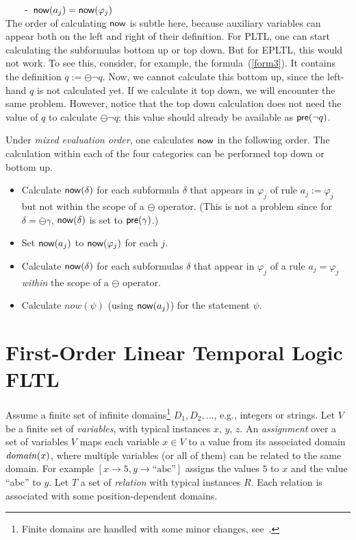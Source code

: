 \ \ \ \ -\ $\mathsf{now} ( a_j ) = \mathsf{now} ( \varphi_j )$ \\

 The order of calculating $\mathsf{now}$ is subtle here, because
auxiliary variables can appear both on the left and right of their
definition. For PLTL, one can start calculating the subformulas
bottom up or top down. But for EPLTL, this would not work. To see this, consider, for example, the formula~(\ref{form3}). It contains
the definition $q := \ominus \neg q$. Now, we cannot calculate this
bottom up, since the left-hand $q$ is not calculated yet.
If we calculate it top down, we will encounter the same problem.
However, notice that the top down calculation does not need the
value of $q$ to calculate $\ominus \neg q$; this value should already be available as $\mathsf{pre} ( \neg q )$.

Under {\em mixed evaluation order}, one calculates $\mathsf{now}$ in the following order. The calculation within each of the four categories can be performed top down or bottom up.
\begin{itemize}
\item Calculate 
$\mathsf{now} ( \delta )$ for each subformula $\delta$
that appears in $\varphi_j$ of rule
$a_j := \varphi_j$ but not within the scope of
a $\ominus$ operator. (This is not
a problem since for $\delta = \ominus \gamma$,
$\mathsf{now} ( \delta )$ is set to $\mathsf{pre} ( \gamma )$.)
\item Set 
$\mathsf{now} ( a_j )$ to $\mathsf{now} ( \varphi_j )$ for each $j$.
\item Calculate $\mathsf{now} ( \delta )$ for each subformulas $\delta$
that appear in $\varphi_j$ of a rule
$a_j = \varphi_j$ {\em  within} the scope of
a $\ominus$ operator.
\item Calculate $now ( \psi )$ (using $\mathsf{now} ( a_j )$) for
the statement $\psi$.
\end{itemize}



\section{First-Order Linear Temporal Logic FLTL}

\label{sec:syntax-semantics}

Assume a finite set of infinite domains\footnote{Finite domains are handled with some minor changes, see~\cite{HPU}.}
$D_1, D_2, \ldots$,
e.g., integers or strings. 
Let $V$ be a finite set of {\em variables}, 
with typical instances $x$, $y$, $z$.
An {\em assignment} over a set of variables $V$
maps each variable $x \in V$ to a value from
its associated domain $\mathit{domain} ( x )$, where multiple variables (or all of them)
can be related to the same domain. For example
$[ x \rightarrow 5 , y \rightarrow \text{``abc''} ]$ assigns
the values $5$ to $x$ and the value ``abc'' to $y$.
Let $T$ a set of {\em relation} 
with typical instances $R$.
Each relation is associated with some position-dependent domains.

